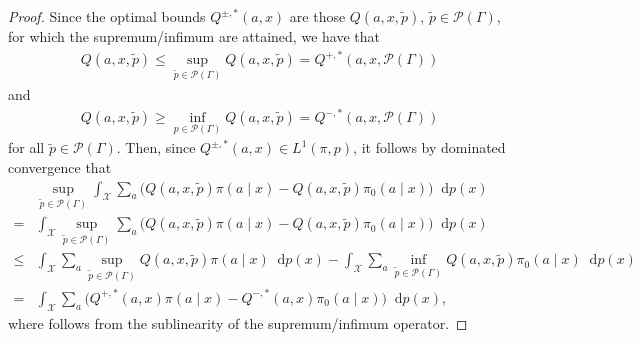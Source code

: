 \documentclass{article} %
\theoremstyle{plain}
\theoremstyle{definition}
\theoremstyle{remark}
\newcommand*\diff{\mathop{}\!\mathrm{d}}
\begin{document}
\begin{proof}
    Since the optimal bounds $Q^{\pm,*}(a,x)$ are those $Q(a,x,\tilde{p})$, $\tilde{p}\in\mathcal{P}(\Gamma)$, for which the supremum/infimum are attained, we have that
    \begin{align}
        Q(a,x,\tilde{p}) \leq \sup_{\tilde{p}\in\mathcal{P}(\Gamma)} Q(a,x,\tilde{p}) = Q^{+,*}(a,x,\mathcal{P}(\Gamma))
    \end{align}
    and
    \begin{align}
        Q(a,x,\tilde{p}) \geq \inf_{p\in\mathcal{P}(\Gamma)} Q(a,x,\tilde{p}) = Q^{-,*}(a,x,\mathcal{P}(\Gamma))
    \end{align}
    for all $\tilde{p}\in\mathcal{P}(\Gamma)$. Then, since $Q^{\pm,*}(a,x)\in L^{1}(\pi,p)$, it follows by dominated convergence that
    \begin{align}
        &\sup_{\tilde{p} \in \mathcal{P}(\Gamma)}  \int_\mathcal{X} \sum_a \Big(Q(a,x, \tilde{p}) \pi(a\mid x) - Q(a,x, \tilde{p}) \pi_0(a\mid x) \Big) \diff p(x)
        \\
        =&  \int_\mathcal{X} \sup_{\tilde{p} \in \mathcal{P}(\Gamma)} \sum_a \Big(Q(a,x, \tilde{p}) \pi(a\mid x) - Q(a,x, \tilde{p}) \pi_0(a\mid x) \Big) \diff p(x)
        \\
        \leq& \int_\mathcal{X} \sum_a \sup_{\tilde{p} \in \mathcal{P}(\Gamma)} Q(a,x, \tilde{p}) \pi(a\mid x) \diff p(x)- \int_\mathcal{X} \sum_a \inf_{\tilde{p} \in \mathcal{P}(\Gamma)} Q(a,x, \tilde{p}) \pi_0(a\mid x) \diff p(x)\label{eq:supremum_inequality}\\
        =& \int_\mathcal{X} \sum_a \Big( Q^{+,*}(a,x) \pi(a\mid x) -   Q^{-,*}(a,x) \pi_0(a\mid x) \Big) \diff p(x),
    \end{align}
    where  follows from the sublinearity of the supremum/infimum operator.
\end{proof}
\clearpage

\end{document}
